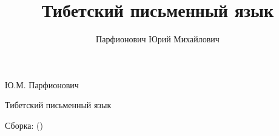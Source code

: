 \documentclass[a4paper,fontsize=14pt,openany,DIV=20]{scrreprt}
\author{Парфионович Юрий Михайлович}
\title{Тибетский письменный язык}
\begin{document}
\begin{titlepage}
    \centering
    \vspace*{\fill}
    {\Large Ю.М. Парфионович\par}
    \vspace{5em}
    {\Huge Тибетский письменный язык\par}
    \vspace*{\fill}
    Сборка\gitRels: \gitAbbrevHash{} (\gitAuthorDate)
\end{titlepage}
\setcounter{tocdepth}{4}
\tableofcontents












\newpage
{}
\renewcommand\indexname{Указатель служебных слов и частиц}
\printindex
\end{document}

